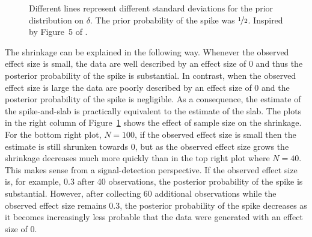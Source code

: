\documentclass[a4paper]{article}
\newenvironment{revision}{\color{teal}}{\color{black}}
\begin{document}
\begin{revision}
\begin{figure}[!ht]
{		Different lines represent different standard deviations for the prior distribution on $\delta$.
		The prior probability of the spike was $\nicefrac{1}{2}$.
		Inspired by Figure~5 of \textcite{RouderEtAl2018PBR}.
	}
	\label{fig:S_vs_SS_4_panel}
\end{figure}
The shrinkage can be explained in the following way.
Whenever the observed effect size is small, the data are well described by an effect size of 0 and thus the posterior probability of the spike is substantial.
In contrast, when the observed effect size is large the data are poorly described by an effect size of 0 and the posterior probability of the spike is negligible.
As a consequence, the estimate of the spike-and-slab is practically equivalent to the estimate of the slab.
The plots in the right column of Figure~\ref{fig:S_vs_SS_4_panel} shows the effect of sample size on the shrinkage.
For the bottom right plot, $N = 100$, if the observed effect size is small then the estimate is still shrunken towards 0, but as the observed effect size grows the shrinkage decreases much more quickly than in the top right plot where $N = 40$.
This makes sense from a signal-detection perspective. 
If the observed effect size is, for example, 0.3 after 40 observations, the posterior probability of the spike is substantial.
However, after collecting 60 additional observations while the observed effect size remains 0.3, the posterior probability of the spike decreases as it becomes increasingly less probable that the data were generated with an effect size of 0.


\end{revision}
\end{document}
